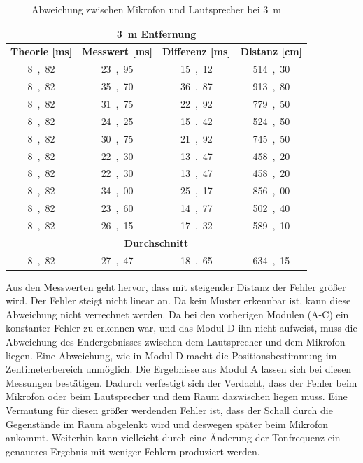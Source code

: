 \begin{table}[H]
\centering
\caption{Abweichung zwischen Mikrofon und Lautsprecher bei \SI{3}{m}}
\label{tab:modul_D_3}
\begin{tabular}{|c|c|c|c|}
\hline
\multicolumn{4}{|c|}{\textbf{\SI{3}{\m} Entfernung}}                                                                                                              \\ \hline
\textbf{Theorie [\si{ms}]} & \textbf{Messwert [\si{ms}]} & \multicolumn{1}{l|}{\textbf{Differenz [\si{ms}]}} & \multicolumn{1}{l|}{\textbf{Distanz [\si{cm}]}} \\ \hline
\si{8,82}	 & 	\si{23,95}	 & 	\si{15,12}	 & 	\si{514,30}	 \\ \hline
\si{8,82}	 & 	\si{35,70}	 & 	\si{36,87}	 & 	\si{913,80}	 \\ \hline
\si{8,82}	 & 	\si{31,75}	 & 	\si{22,92}	 & 	\si{779,50}	 \\ \hline
\si{8,82}	 & 	\si{24,25}	 & 	\si{15,42}	 & 	\si{524,50}	 \\ \hline
\si{8,82}	 & 	\si{30,75}	 & 	\si{21,92}	 & 	\si{745,50}	 \\ \hline
\si{8,82}	 & 	\si{22,30}	 & 	\si{13,47}	 & 	\si{458,20}	 \\ \hline
\si{8,82}	 & 	\si{22,30}	 & 	\si{13,47}	 & 	\si{458,20}	 \\ \hline
\si{8,82}	 & 	\si{34,00}	 & 	\si{25,17}	 & 	\si{856,00}	 \\ \hline
\si{8,82}	 & 	\si{23,60}	 & 	\si{14,77}	 & 	\si{502,40}	 \\ \hline
\si{8,82}	 & 	\si{26,15}	 & 	\si{17,32}	 & 	\si{589,10}	 \\ \hline
\multicolumn{4}{|c|}{\textbf{Durchschnitt}}                                                                                                                \\ \hline
\si{8,82}	 & 	\si{27,47}	 & 	\si{18,65}	 & 	\si{634,15}	 \\ \hline
\end{tabular}
\end{table}


Aus den Messwerten geht hervor, dass mit steigender Distanz der Fehler größer wird. Der Fehler steigt nicht linear an. Da kein Muster erkennbar ist, kann diese Abweichung nicht verrechnet werden. Da bei den vorherigen Modulen (A-C) ein konstanter Fehler zu erkennen war, und das Modul D ihn nicht aufweist, muss die Abweichung des Endergebnisses zwischen dem Lautsprecher und dem Mikrofon liegen. Eine Abweichung, wie in Modul D macht die Positionsbestimmung im Zentimeterbereich unmöglich. Die Ergebnisse aus Modul A lassen sich bei diesen Messungen bestätigen. Dadurch verfestigt sich der Verdacht, dass der Fehler beim Mikrofon oder beim Lautsprecher und dem Raum dazwischen liegen muss. Eine Vermutung für diesen größer werdenden Fehler ist, dass der Schall durch die Gegenstände im Raum abgelenkt wird und deswegen später beim Mikrofon ankommt. Weiterhin kann vielleicht durch eine Änderung der Tonfrequenz ein genaueres Ergebnis mit weniger Fehlern produziert werden. 

